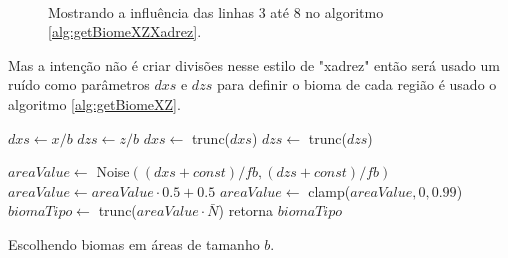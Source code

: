  
\begin{figure}[H]
     \centering
     \hspace{0.1cm}
     \\
     
     \caption{Mostrando a influência das linhas 3 até 8 no algoritmo \ref{alg:getBiomeXZXadrez}.}
     
     \label{fig:ssxadrez}
\end{figure}

Mas a intenção não é criar divisões nesse estilo de "xadrez" então será usado um 
ruído como parâmetros $dxs$ e $dzs$ para definir o bioma de cada região é usado
o algoritmo \ref{alg:getBiomeXZ}.

\begin{algorithm}[H]\label{alg:getBiomeXZ}
    $dxs \leftarrow x/b$\;
    $dzs \leftarrow z/b$\;
    $dxs \leftarrow$ trunc($dxs$)\;
    $dzs \leftarrow$ trunc($dzs$)\;
    
    $areaValue \leftarrow$ Noise$((dxs + const)/fb, (dzs + const)/fb)$\;
    $areaValue \leftarrow  areaValue \cdot 0.5 + 0.5$\;
    $areaValue \leftarrow$ clamp($areaValue, 0, 0.99$)\;
    $biomaTipo \leftarrow$ trunc($areaValue \cdot \bar{N}$)\;
    retorna $biomaTipo$\;
    \caption{Escolhendo biomas em áreas de tamanho $b$.}
\end{algorithm}

